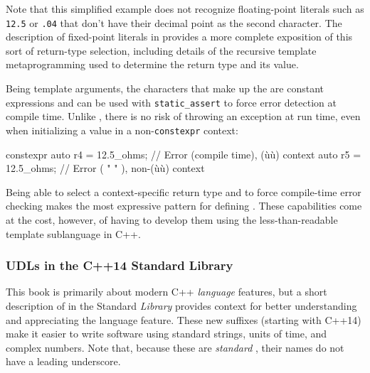 \noindent Note that this simplified example does not recognize floating-point
literals such as \lstinline!12.5! or \lstinline!.04! that don't have their
decimal point as the second character. The description of fixed-point
literals in  provides a more complete exposition of this sort
of return-type selection, including details of the recursive template
metaprogramming used to determine the return type and its value.

Being template arguments, the characters that make up the  are constant expressions and can be used with
\lstinline!static_assert! to force error detection at compile time. Unlike
, there is no risk of throwing an exception at
run time, even when initializing a value in a non-\lstinline!constexpr!
context:

\begin{emcppslisting}
constexpr auto r4 = 12.5_ohms;  // Error (compile time), (ù{}ù) context
          auto r5 = 12.5_ohms;  // Error (   "      " ), non-(ù{}ù) context
\end{emcppslisting}
    
\noindent Being able to select a context-specific return type and to force
compile-time error checking makes  the
most expressive pattern for defining . These
capabilities come at the cost, however, of having to develop them using
the less-than-readable template sublanguage in C++.

\subsubsection[UDLs in the C++14 Standard Library]{UDLs in the C++14 Standard Library}\label{udls-in-the-c++14-standard-library}

This book is primarily about modern C++ \emph{language} features, but a
short description of  in the Standard
\emph{Library} provides context for better understanding and
appreciating the  language feature. These new suffixes
(starting with C++14) make it easier to write software using standard
strings, units of time, and complex numbers. Note that, because these
are \emph{standard} , their names do not have a
leading underscore.

